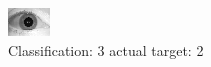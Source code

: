 \begin{figure}[h!]
\begin{center}
\includegraphics[width=0.60\columnwidth]{figures/ID1628_class_3_target_2.png}
\end{center}
\caption{ Classification: 3 actual target: 2}
\label{fig:ID1628_class_3_target_2}
\end{figure}

